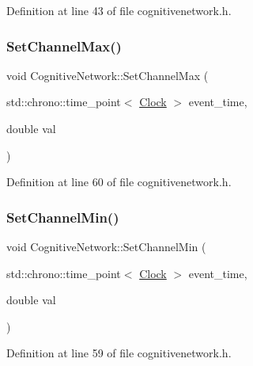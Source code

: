 Definition at line 43 of file cognitivenetwork.\+h.

\mbox{\label{class_cognitive_network_a9c208d66ee284adfceb3b2dd76532a00}} 
\subsubsection{\texorpdfstring{Set\+Channel\+Max()}{SetChannelMax()}}
{\footnotesize\ttfamily void Cognitive\+Network\+::\+Set\+Channel\+Max (\begin{DoxyParamCaption}\item[{std\+::chrono\+::time\+\_\+point$<$ \hyperlink{universe_8h_a0ef8d951d1ca5ab3cfaf7ab4c7a6fd80}{Clock} $>$}]{event\+\_\+time,  }\item[{double}]{val }\end{DoxyParamCaption})\hspace{0.3cm}{\ttfamily [inline]}}



Definition at line 60 of file cognitivenetwork.\+h.

\mbox{\label{class_cognitive_network_a6e2a6ced4ede9a4eef721d6c5aac433c}} 
\subsubsection{\texorpdfstring{Set\+Channel\+Min()}{SetChannelMin()}}
{\footnotesize\ttfamily void Cognitive\+Network\+::\+Set\+Channel\+Min (\begin{DoxyParamCaption}\item[{std\+::chrono\+::time\+\_\+point$<$ \hyperlink{universe_8h_a0ef8d951d1ca5ab3cfaf7ab4c7a6fd80}{Clock} $>$}]{event\+\_\+time,  }\item[{double}]{val }\end{DoxyParamCaption})\hspace{0.3cm}{\ttfamily [inline]}}



Definition at line 59 of file cognitivenetwork.\+h.

\mbox{\label{class_cognitive_network_a99f801aeca299186cc706696696749b1}} 
